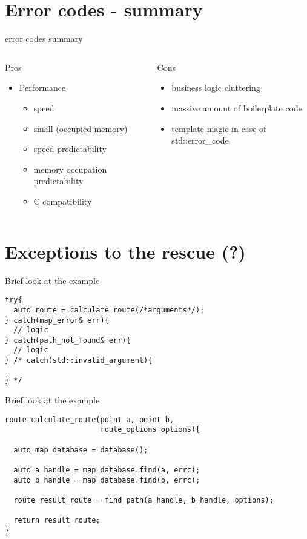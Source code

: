 \documentclass[10pt]{beamer}
\begin{document}
	
\section{Error codes - summary}

\begin{frame}{error codes summary}
	\begin{columns}
		\begin{column}{0.48\linewidth}
			Pros 
			\vfill
			\begin{itemize}
				\item Performance
				\begin{itemize}
					\item speed
					\item small (occupied memory)
					\item speed predictability
					\item memory occupation predictability
					\item C compatibility
				\end{itemize}
			\end{itemize}
		\end{column}
		\begin{column}{0.48\linewidth}
			Cons
			\vfill
			\begin{itemize}
				\item business logic cluttering
				\item massive amount of boilerplate code
				\item template magic in case of std::error\_code
			\end{itemize}
		\end{column}
	\end{columns}
\end{frame}


\section{Exceptions to the rescue (?)}

\begin{frame}[fragile]{Brief look at the example}
	\begin{verbatim}
try{
  auto route = calculate_route(/*arguments*/);
} catch(map_error& err){
  // logic
} catch(path_not_found& err){
  // logic
} /* catch(std::invalid_argument){

} */
	\end{verbatim}
\end{frame}

\begin{frame}[fragile]{Brief look at the example}
	\begin{verbatim}
route calculate_route(point a, point b,
                      route_options options){
                      
  auto map_database = database();

  auto a_handle = map_database.find(a, errc);
  auto b_handle = map_database.find(b, errc);

  route result_route = find_path(a_handle, b_handle, options);

  return result_route;
}
	\end{verbatim}
\end{frame}
\end{document}
